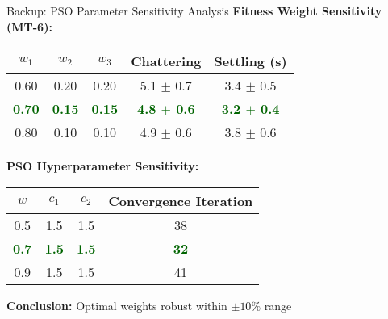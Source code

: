 \documentclass[10pt,aspectratio=169]{beamer}
\newcommand{\emphgreen}[1]{\textcolor{darkgreen}{\textbf{#1}}}
\begin{document}
\begin{frame}{Backup: PSO Parameter Sensitivity Analysis}
\textbf{Fitness Weight Sensitivity (MT-6):}

\begin{table}
\centering
\small
\begin{tabular}{ccccc}
\toprule
\textbf{$w_1$} & \textbf{$w_2$} & \textbf{$w_3$} & \textbf{Chattering} & \textbf{Settling (s)} \\
\midrule
0.60 & 0.20 & 0.20 & 5.1 $\pm$ 0.7 & 3.4 $\pm$ 0.5 \\
\emphgreen{0.70} & \emphgreen{0.15} & \emphgreen{0.15} & \emphgreen{4.8 $\pm$ 0.6} & \emphgreen{3.2 $\pm$ 0.4} \\
0.80 & 0.10 & 0.10 & 4.9 $\pm$ 0.6 & 3.8 $\pm$ 0.6 \\
\bottomrule
\end{tabular}
\end{table}

\textbf{PSO Hyperparameter Sensitivity:}

\begin{table}
\centering
\small
\begin{tabular}{cccc}
\toprule
\textbf{$w$} & \textbf{$c_1$} & \textbf{$c_2$} & \textbf{Convergence Iteration} \\
\midrule
0.5 & 1.5 & 1.5 & 38 \\
\emphgreen{0.7} & \emphgreen{1.5} & \emphgreen{1.5} & \emphgreen{32} \\
0.9 & 1.5 & 1.5 & 41 \\
\bottomrule
\end{tabular}
\end{table}

\vspace{0.3cm}
\textbf{Conclusion:} Optimal weights robust within $\pm 10\%$ range
\end{frame}
\end{document}
